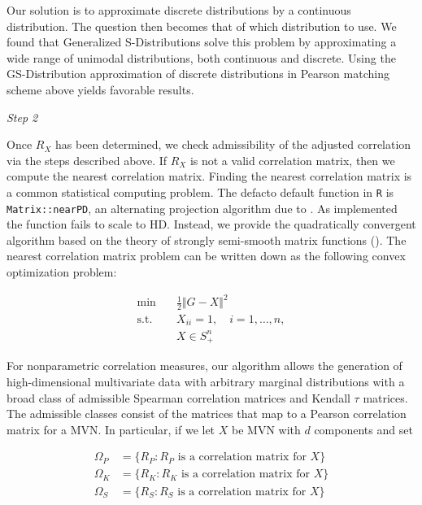 \documentclass[
]{jss}
\begin{document}
Our solution is to approximate discrete distributions by a continuous
distribution. The question then becomes that of which distribution to
use. We found that Generalized S-Distributions \citep{muino2006gs} solve
this problem by approximating a wide range of unimodal distributions,
both continuous and discrete. Using the GS-Distribution approximation of
discrete distributions in Pearson matching scheme above yields favorable
results.

\emph{Step 2}

Once \(R_X\) has been determined, we check admissibility of the adjusted
correlation via the steps described above. If \(R_X\) is not a valid
correlation matrix, then we compute the nearest correlation matrix.
Finding the nearest correlation matrix is a common statistical computing
problem. The defacto default function in \texttt{R} is
\texttt{Matrix::nearPD}, an alternating projection algorithm due to
\citet{higham2002computing}. As implemented the function fails to scale
to HD. Instead, we provide the quadratically convergent algorithm based
on the theory of strongly semi-smooth matrix functions
(\citet{qi2006quadratically}). The nearest correlation matrix problem
can be written down as the following convex optimization problem:

\begin{align*}
    \mathrm{min}\quad & \frac{1}{2} \Vert G - X \Vert^2 \\
    \mathrm{s.t.}\quad & X_{ii} = 1, \quad i = 1, \ldots , n, \\
    & X \in S_{+}^{n}
\end{align*}

For nonparametric correlation measures, our algorithm allows the
generation of high-dimensional multivariate data with arbitrary marginal
distributions with a broad class of admissible Spearman correlation
matrices and Kendall \(\tau\) matrices. The admissible classes consist
of the matrices that map to a Pearson correlation matrix for a MVN. In
particular, if we let \(X\) be MVN with \(d\) components and set

\begin{align*}
\Omega_P &= \{ R_P : R_P \textrm{ is a correlation matrix for } X \} \\
\Omega_K &= \{ R_K : R_K \textrm{ is a correlation matrix for } X \} \\
\Omega_S &= \{ R_S : R_S \textrm{ is a correlation matrix for } X \} \\
\end{align*}
\end{document}
